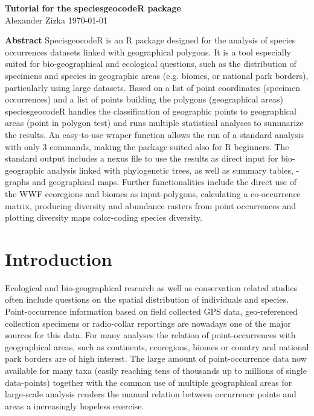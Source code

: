 \documentclass[a4paper,titlepage,11pt]{scrreprt}
\begin{document}
\begin{titlepage}
\vspace*{1cm}
\begin{center}
\huge
\textbf{Tutorial for the speciesgeocodeR package}\\
\vspace{1cm}
\Large {Alexander Zizka  \today} \\
\end{center}

\vspace{1.5cm}
\Large

\normalsize

\textbf{Abstract}  SpecisgeocodeR is an R package designed for the analysis of species occurrences datasets linked with geographical polygons. It is a tool especially suited for bio-geographical and ecological questions, such as the distribution of specimens and species in geographic areas (e.g. biomes, or national park borders), particularly using large datasets. Based on a list of point coordinates (specimen occurrences) and a list of points building the polygons (geographical areas) speciesgeocodeR handles the classification of geographic points to geographical areas (point in polygon test) and runs multiple statistical analyses to summarize the results. An easy-to-use wraper function allows the run of a standard analysis with only 3 commands, making the package suited also for R beginners. The standard output includes a nexus file to use the results as direct input for bio-geographic analysis linked with phylogenetic trees, as well as summary tables, -graphs and geographical maps. Further functionalities include the direct use of the WWF ecoregions and biomes as input-polygons, calculating a co-occurrence matrix, producing diversity and abundance rasters from point occurrences and plotting diversity maps color-coding species diversity.

\end{titlepage}

\tableofcontents

\chapter{Introduction}

Ecological and bio-geographical research as well as conservation related studies often include questions on the spatial distribution of individuals and species. Point-occurrence information based on field collected GPS data, geo-referenced collection specimens or radio-collar reportings are nowadays one of the major sources for this data. For many analyses the relation of point-occurrences with geographical areas, such as continents, ecoregions, biomes or country and national park borders are of high interest. The large amount of point-occurrence data now available for many taxa (easily reaching tens of thousands up to millions of single data-points) together with the common use of multiple geographical areas for large-scale analysis renders the manual relation between occurrence points and areas a increasingly hopeless exercise.
\end{document}
